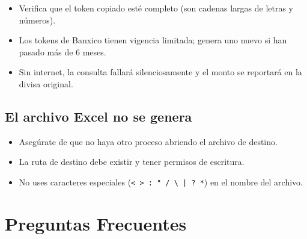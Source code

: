 \documentclass[12pt, a4paper, oneside]{report}
\begin{document}
\begin{itemize}
  \item Verifica que el token copiado esté completo (son cadenas largas
        de letras y números).
  \item Los tokens de Banxico tienen vigencia limitada; genera uno nuevo si
        han pasado más de 6 meses.
  \item Sin internet, la consulta fallará silenciosamente y el monto se
        reportará en la divisa original.
\end{itemize}

\section{El archivo Excel no se genera}

\begin{itemize}
  \item Asegúrate de que no haya otro proceso abriendo el archivo de destino.
  \item La ruta de destino debe existir y tener permisos de escritura.
  \item No uses caracteres especiales (\texttt{< > : " / \textbackslash{} | ? *})
        en el nombre del archivo.
\end{itemize}

\chapter{Preguntas Frecuentes}
\end{document}
